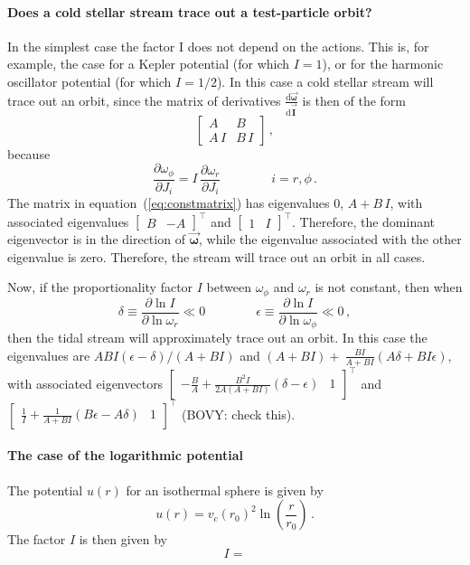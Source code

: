 \documentclass[12pt]{article}
\newcommand{\dd}{\mathrm{d}}
\newcommand{\tvector}[1]{\boldsymbol{\vec{#1}}}
\newcommand{\vI}{\tvector{I}}
\newcommand{\vomega}{\tvector{\omega}}
\newcommand{\matrixleft}{\left[}
\newcommand{\matrixright}{\right]}
\newcommand{\eqnname}{equation}
\newcommand{\T}{^{\scriptscriptstyle \top}}   %
\begin{document}
\paragraph{Does a cold stellar stream trace out a test-particle orbit?}
In the simplest case the factor I does not depend on the actions. This
is, for example, the case for a Kepler potential (for which $I=1$), or
for the harmonic oscillator potential (for which $I=1/2$). In this
case a cold stellar stream will trace out an orbit, since the matrix
of derivatives $\frac{\dd\vomega}{\dd\vI}$ is then of the form
\begin{equation}\label{eq:constmatrix}
\matrixleft \begin{array}{cc} A & B\\ A\,I& B\,I\end{array}\matrixright\, ,
\end{equation}
because
\begin{equation}
\frac{\partial \omega_\phi}{\partial J_i} = I\,\frac{\partial
  \omega_r}{\partial J_i} \qquad \qquad i=r,\phi\, .
\end{equation}
The matrix in \eqnname~(\ref{eq:constmatrix}) has eigenvalues 0,
$A+B\,I$, with associated eigenvalues $\matrixleft \begin{array}{cc} B
& -A \end{array}\matrixright\T$ and $\matrixleft \begin{array}{cc} 1
&I\end{array}\matrixright\T$. Therefore, the dominant eigenvector is
in the direction of $\vomega$, while the eigenvalue associated with
the other eigenvalue is zero. Therefore, the stream will trace out an
orbit in all cases.

Now, if the proportionality factor $I$ between $\omega_\phi$ and
$\omega_r$ is not constant, then when
\begin{equation}
\delta \equiv \frac{\partial \ln I}{\partial \ln \omega_r} \ll 0 \qquad \qquad \epsilon \equiv \frac{\partial \ln I}{\partial \ln \omega_\phi} \ll 0\, ,
\end{equation}
then the tidal stream will approximately trace out an orbit. In this
case the eigenvalues are $ABI(\epsilon-\delta)/(A+BI)$ and $(A+BI) +\
\frac{BI}{A+BI}(A\delta+BI\epsilon)$, with associated eigenvectors
$\matrixleft \begin{array}{cc} -\frac{B}{A} +
\frac{B^2I}{2A(A+BI)}(\delta-\epsilon) & 1 \end{array}\matrixright\T$
and $\matrixleft \begin{array}{cc} \frac{1}{I}
+\frac{1}{A+BI}(B\epsilon-A\delta) &1\end{array}\matrixright\T$ (BOVY:
check this).

\paragraph{The case of the logarithmic potential}
The potential $u(r)$ for an isothermal sphere is given by
\begin{equation}
u(r) = v_c(r_0)^2 \ln (\frac{r}{r_0})\, .
\end{equation}
The factor $I$ is then given by
\begin{equation}
I = 
\end{equation}

 
\end{document}
